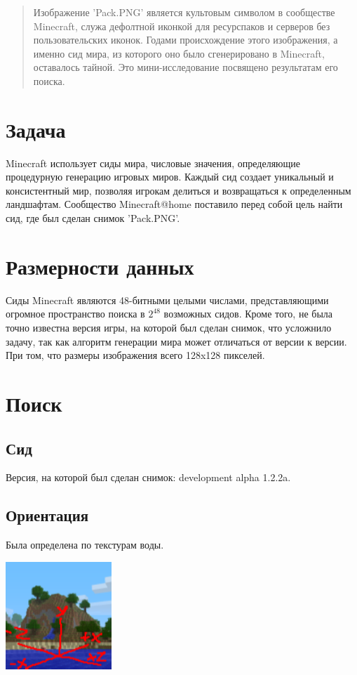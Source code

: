\begin{abstract}
    Изображение 'Pack.PNG' является культовым символом в сообществе Minecraft, служа дефолтной иконкой для ресурспаков и серверов без пользовательских иконок. Годами происхождение этого изображения, а именно сид мира, из которого оно было сгенерировано в Minecraft, оставалось тайной. Это мини-исследование посвящено результатам его поиска. 
\end{abstract}

\section{Задача}

Minecraft использует сиды мира, числовые значения, определяющие процедурную генерацию игровых миров. Каждый сид создает уникальный и консистентный мир, позволяя игрокам делиться и возвращаться к определенным ландшафтам. Сообщество Minecraft@home поставило перед собой цель найти сид, где был сделан снимок 'Pack.PNG'.  

\section{Размерности данных}

Сиды Minecraft являются 48-битными целыми числами, представляющими огромное пространство поиска в $2^{48}$ возможных сидов. Кроме того, не была точно известна версия игры, на которой был сделан снимок, что усложнило задачу, так как алгоритм генерации мира может отличаться от версии к версии. При том, что размеры изображения всего 128x128 пикселей.  

\newpage

\section{Поиск}

\subsection{Сид}
Версия, на которой был сделан снимок: development alpha 1.2.2a.
\subsection{Ориентация}
Была определена по текстурам воды.

\begin{center}
    \includegraphics[width=0.5\linewidth]{orientation.png}
\end{center}

